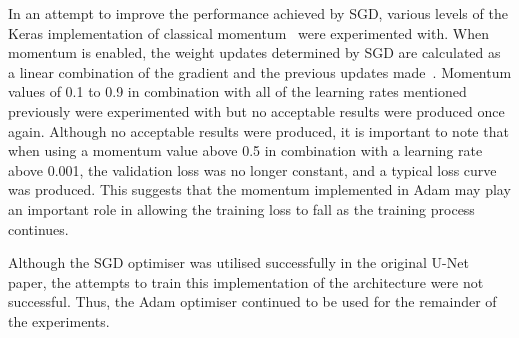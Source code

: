 In an attempt to improve the performance achieved by SGD, various levels of the Keras implementation of classical momentum~\cite{polyak} were experimented with. When momentum is enabled, the weight updates determined by SGD are calculated as a linear combination of the gradient and the previous updates made~\cite{momentum}. Momentum values of 0.1 to 0.9 in combination with all of the learning rates mentioned previously were experimented with but no acceptable results were produced once again. Although no acceptable results were produced, it is important to note that when using a momentum value above 0.5 in combination with a learning rate above 0.001, the validation loss was no longer constant, and a typical loss curve was produced. This suggests that the momentum implemented in Adam may play an important role in allowing the training loss to fall as the training process continues.

Although the SGD optimiser was utilised successfully in the original U-Net paper, the attempts to train this implementation of the architecture were not successful. Thus, the Adam optimiser continued to be used for the remainder of the experiments.


